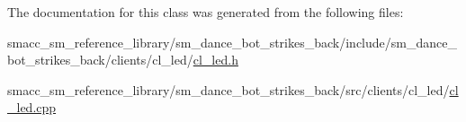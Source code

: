 The documentation for this class was generated from the following files\+:\begin{DoxyCompactItemize}
\item 
smacc\+\_\+sm\+\_\+reference\+\_\+library/sm\+\_\+dance\+\_\+bot\+\_\+strikes\+\_\+back/include/sm\+\_\+dance\+\_\+bot\+\_\+strikes\+\_\+back/clients/cl\+\_\+led/\hyperlink{strikes__back_2include_2sm__dance__bot__strikes__back_2clients_2cl__led_2cl__led_8h}{cl\+\_\+led.\+h}\item 
smacc\+\_\+sm\+\_\+reference\+\_\+library/sm\+\_\+dance\+\_\+bot\+\_\+strikes\+\_\+back/src/clients/cl\+\_\+led/\hyperlink{strikes__back_2src_2clients_2cl__led_2cl__led_8cpp}{cl\+\_\+led.\+cpp}\end{DoxyCompactItemize}
